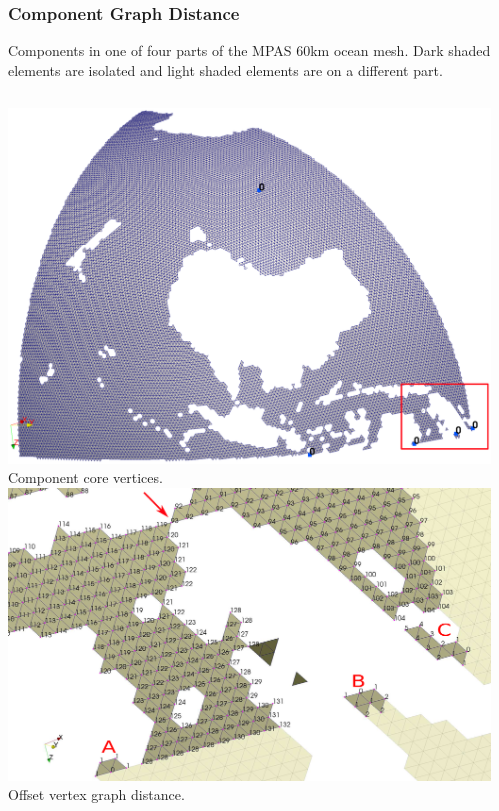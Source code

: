 \documentclass{beamer}
\begin{document}
\begin{frame}
  \frametitle{Component Graph Distance}
  \small 
  Components in one of four parts of the MPAS 60km ocean mesh.  Dark shaded
  elements are isolated and light shaded elements are on a different part.
  \begin{columns}
    \begin{column}{0.5\textwidth}
      \centering
      \tiny 
      \includegraphics[width=.9\textwidth]
        {../parmaimprovement/figs/compDist/p2core.eps}\\
      Component core vertices.\\
      \includegraphics[width=.9\textwidth]
        {../parmaimprovement/figs/compDist/p2distComps_nocolor.eps}\\
      Offset vertex graph distance.
    \end{column}
    \centering
    \begin{column}{0.4\textwidth}
      \tiny 
      \begin{column}{0.5\textwidth}

\end{column}
\end{column}
\end{columns}
\end{frame}
\end{document}
